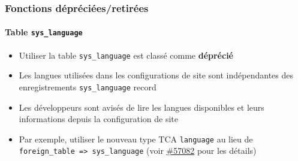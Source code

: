 %

\begin{frame}[fragile]
	\frametitle{Fonctions dépréciées/retirées}
	\framesubtitle{Table \texttt{sys\_language}}

	\begin{itemize}
		\item Utiliser la table \texttt{sys\_language} est classé comme \textbf{déprécié}
		\item Les langues utilisées dans les configurations de site sont indépendantes des enregistrements
			\texttt{sys\_language} record
		\item Les développeurs sont avisés de lire les langues disponibles et leurs informations
			depuis la configuration de site
		\item Par exemple, utiliser le nouveau type TCA \texttt{language} au lieu de
			\texttt{foreign\_table => sys\_language}
			(voir \href{https://forge.typo3.org/issues/57082}{\#57082} pour les détails)
	\end{itemize}

\end{frame}

